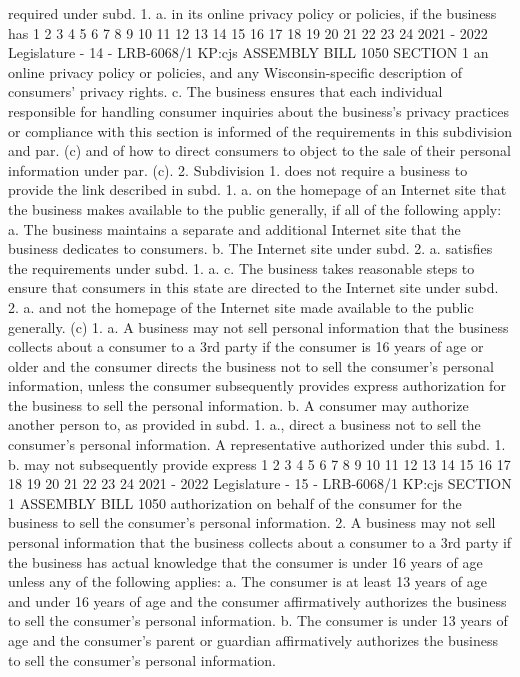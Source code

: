 required under subd. 1. a. in its online privacy policy or policies, if the business has
1
2
3
4
5
6
7
8
9
10
11
12
13
14
15
16
17
18
19
20
21
22
23
24
2021 - 2022 Legislature - 14 - LRB-6068/1
KP:cjs
 ASSEMBLY BILL 1050 SECTION 1
an online privacy policy or policies, and any Wisconsin-specific description of
consumers' privacy rights.
c. The business ensures that each individual responsible for handling
consumer inquiries about the business's privacy practices or compliance with this
section is informed of the requirements in this subdivision and par. (c) and of how to
direct consumers to object to the sale of their personal information under par. (c).
2. Subdivision 1. does not require a business to provide the link described in
subd. 1. a. on the homepage of an Internet site that the business makes available to
the public generally, if all of the following apply:
a. The business maintains a separate and additional Internet site that the
business dedicates to consumers.
b. The Internet site under subd. 2. a. satisfies the requirements under subd.
1. a.
c. The business takes reasonable steps to ensure that consumers in this state
are directed to the Internet site under subd. 2. a. and not the homepage of the
Internet site made available to the public generally.
(c) 1. a. A business may not sell personal information that the business collects
about a consumer to a 3rd party if the consumer is 16 years of age or older and the
consumer directs the business not to sell the consumer's personal information,
unless the consumer subsequently provides express authorization for the business
to sell the personal information.
b. A consumer may authorize another person to, as provided in subd. 1. a.,
direct a business not to sell the consumer's personal information. A representative
authorized under this subd. 1. b. may not subsequently provide express
1
2
3
4
5
6
7
8
9
10
11
12
13
14
15
16
17
18
19
20
21
22
23
24
2021 - 2022 Legislature - 15 - LRB-6068/1
KP:cjs
SECTION 1 ASSEMBLY BILL 1050
authorization on behalf of the consumer for the business to sell the consumer's
personal information.
2. A business may not sell personal information that the business collects about
a consumer to a 3rd party if the business has actual knowledge that the consumer
is under 16 years of age unless any of the following applies:
a. The consumer is at least 13 years of age and under 16 years of age and the
consumer affirmatively authorizes the business to sell the consumer's personal
information.
b. The consumer is under 13 years of age and the consumer's parent or guardian
affirmatively authorizes the business to sell the consumer's personal information.
